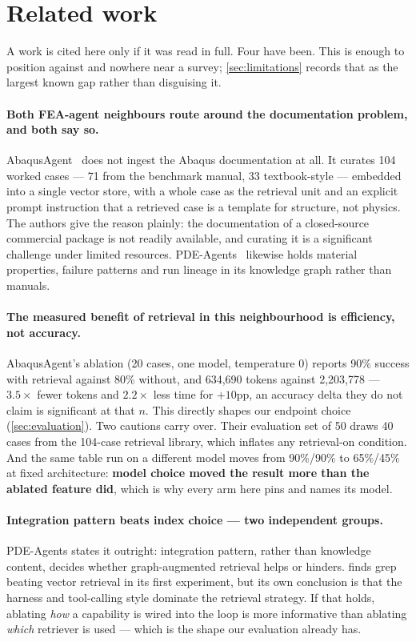 \section{Related work}
\label{sec:related}

A work is cited here only if it was read in full. Four have been. This is
enough to position against and nowhere near a survey; \cref{sec:limitations}
records that as the largest known gap rather than disguising it.

\paragraph{Both FEA-agent neighbours route around the documentation problem,
and both say so.}
AbaqusAgent~\cite{abaqusagent2026} does not ingest the Abaqus documentation at
all. It curates 104 worked cases --- 71 from the benchmark manual, 33
textbook-style --- embedded into a single vector store, with a whole case as
the retrieval unit and an explicit prompt instruction that a retrieved case is
a template for structure, not physics. The authors give the reason plainly:
the documentation of a closed-source commercial package is not readily
available, and curating it is a significant challenge under limited resources.
PDE-Agents~\cite{pdeagents2026} likewise holds material properties, failure
patterns and run lineage in its knowledge graph rather than manuals.

\paragraph{The measured benefit of retrieval in this neighbourhood is
efficiency, not accuracy.}
AbaqusAgent's ablation (20 cases, one model, temperature 0) reports 90\%
success with retrieval against 80\% without, and 634{,}690 tokens against
2{,}203{,}778 --- $3.5\times$ fewer tokens and $2.2\times$ less time for
$+10$pp, an accuracy delta they do not claim is significant at that $n$. This
directly shapes our endpoint choice (\cref{sec:evaluation}). Two cautions
carry over. Their evaluation set of 50 draws 40 cases from the 104-case
retrieval library, which inflates any retrieval-on condition. And the same
table run on a different model moves from 90\%/90\% to 65\%/45\% at fixed
architecture: \textbf{model choice moved the result more than the ablated
feature did}, which is why every arm here pins and names its model.

\paragraph{Integration pattern beats index choice --- two independent groups.}
PDE-Agents states it outright: integration pattern, rather than knowledge
content, decides whether graph-augmented retrieval helps or hinders.
\cite{grepallyouneed2026} finds grep beating vector retrieval in its first
experiment, but its own conclusion is that the harness and tool-calling style
dominate the retrieval strategy. If that holds, ablating \emph{how} a
capability is wired into the loop is more informative than ablating
\emph{which} retriever is used --- which is the shape our evaluation already
has.

